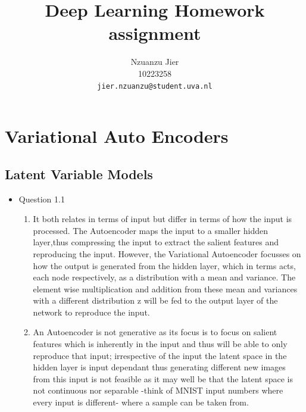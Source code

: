\documentclass{article}
\title{Deep Learning Homework assignment}
\author{%
  Nzuanzu Jier \\
  10223258 \\
  \texttt{jier.nzuanzu@student.uva.nl} \\
}
\begin{document}

\maketitle

\section{Variational Auto Encoders}
  \subsection{Latent Variable Models}
    \begin{itemize}
      \item Question 1.1
      \begin{enumerate}
        \item It both relates in terms of input but differ in terms of how the input is processed. The Autoencoder maps the input to a smaller hidden layer,thus compressing the input to extract the salient features and reproducing the input. However, the Variational Autoencoder focusses on how the output is generated from the hidden layer, which in terms acts, each node respectively, as a distribution with a mean and variance. The element wise multiplication and addition from these mean and variances with a different distribution z will be fed to the output layer of the network to reproduce the input. 
        \item  An Autoencoder is not generative as its focus is to focus on salient features which is inherently in the input and thus will be able to only reproduce that input; irrespective of the input the latent space in the hidden layer is input dependant thus generating different new images from this input is not feasible as it may well be that the latent space is not continuous nor separable -think of MNIST input numbers where every input is different- where a sample can be taken from. 
      \end{enumerate}
    \end{itemize}
\end{document}

